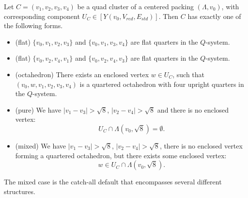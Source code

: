 %

\begin{lemma}
Let $C=(v_1,v_2,v_3,v_4)$ be a quad cluster
of a centered packing $(\Lambda,v_0)$, with corresponding component 
$U_C\in [Y(v_0,V_{red},E_{std})]$.  
Then $C$ has
exactly one of the following forms.
\begin{itemize}
  \item (flat) $\{v_0,v_1,v_2,v_3\}$ and $\{v_0,v_1,v_3,v_4\}$ are flat
    quarters in the $Q$-system.
   \item (flat) $\{v_0,v_2,v_4,v_1\}$ and $\{v_0,v_2,v_4,v_3\}$ are flat
     quarters in the $Q$-system.
     \item (octahedron) There exists an enclosed vertex $w\in U_C$, 
       such that
       $(v_0,w,v_1,v_2,v_3,v_4)$ is a quartered octahedron with
       four upright quarters in the $Q$-system.
   \item (pure) We have $|v_1-v_3|>\sqrt8$, $|v_2-v_4|>\sqrt8$ and
     there is no enclosed vertex: 
        $$U_C\cap\Lambda(v_0,\sqrt8) = \emptyset.$$
    \item (mixed) We have $|v_1-v_3|>\sqrt8$, $|v_2-v_4|>\sqrt8$, there
      is no enclosed vertex forming a quartered octahedron, but
      there exists some enclosed vertex: 
        $$w \in U_C\cap\Lambda(v_0,\sqrt8).$$
\end{itemize}
\end{lemma}

The mixed case is the catch-all default that encompasses several
different structures.


